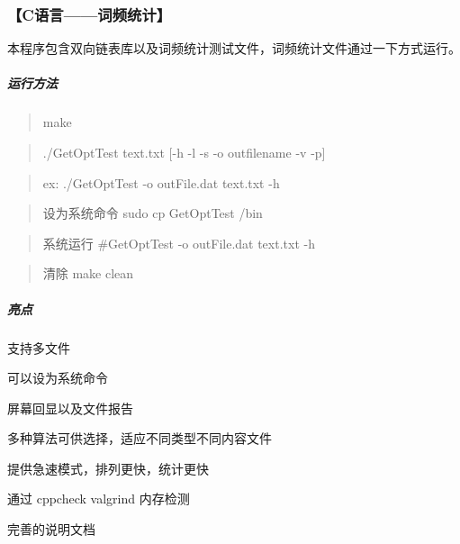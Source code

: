 \subsubsection*{【\-C语言——词频统计】}


\begin{DoxyItemize}
\item 本程序包含双向链表库以及词频统计测试文件，词频统计文件通过一下方式运行。
\end{DoxyItemize}

\subparagraph*{运行方法}

\begin{quotation}
make

\end{quotation}


\begin{quotation}
./\-Get\-Opt\-Test text.\-txt \mbox{[}-\/h -\/l -\/s -\/o outfilename -\/v -\/p\mbox{]}

\end{quotation}


\begin{quotation}
ex\-: ./\-Get\-Opt\-Test -\/o out\-File.\-dat text.\-txt -\/h

\end{quotation}


\begin{quotation}
设为系统命令 sudo cp Get\-Opt\-Test /bin

\end{quotation}


\begin{quotation}
系统运行 \#\-Get\-Opt\-Test -\/o out\-File.\-dat text.\-txt -\/h

\end{quotation}


\begin{quotation}
清除 make clean

\end{quotation}


\subparagraph*{亮点}


\begin{DoxyItemize}
\item 支持多文件
\item 可以设为系统命令
\item 屏幕回显以及文件报告
\item 多种算法可供选择，适应不同类型不同内容文件
\item 提供急速模式，排列更快，统计更快
\item 通过 cppcheck valgrind 内存检测
\item 完善的说明文档
\end{DoxyItemize}

